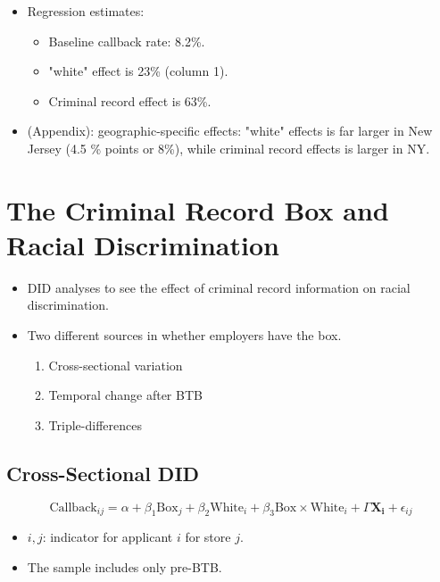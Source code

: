 \documentclass[../root]{subfiles}
\begin{document}
    \begin{itemize}
      \item Regression estimates:
      \begin{itemize}
        \item Baseline callback rate: 8.2\%.
        \item "white" effect is 23\% (column 1).
        \item Criminal record effect is 63\%.
      \end{itemize}
      \item (Appendix): geographic-specific effects: "white" effects is far larger in New Jersey (4.5 \% points or 8\%), while criminal record effects is larger in NY.
    \end{itemize}


    \section{The Criminal Record Box and Racial Discrimination}

    \begin{itemize}
      \item DID analyses to see the effect of criminal record information on racial discrimination.
      \item Two different sources in whether employers have the box.
      \begin{enumerate}
        \item Cross-sectional variation
        \item Temporal change after BTB
        \item Triple-differences
      \end{enumerate}
    \end{itemize}

    \subsection{Cross-Sectional DID}

    \[
    \text{Callback}_{ij} = \alpha + \beta_1 \text{Box}_j + \beta_2 \text{White}_i + \beta_3 \text{Box} \times \text{White}_i + \Gamma \mathbf{X_i} + \epsilon_{ij}
    \]

    \begin{itemize}
      \item $i, j$: indicator for applicant $i$ for store $j$.
      \item The sample includes only pre-BTB.
    \end{itemize}
\end{document}
